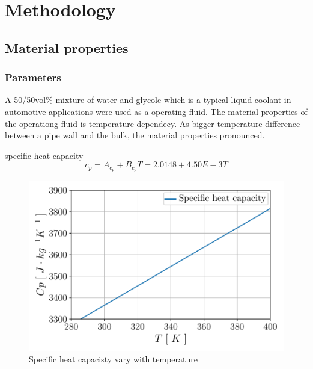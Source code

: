 \documentclass[12pt,oneside]{jbook}
\begin{document}
\chapter{Methodology}
\section{Material properties}

\subsection{Parameters}
A 50/50vol\% mixture of water and glycole which is a typical liquid coolant in automotive applications were used as a operating fluid.
The material properties of the operationg fluid is temperature dependecy.
As bigger temperature difference between a pipe wall and the bulk, the material properties pronounced.


specific heat capacity
\begin{equation}
	c_{p} = A_{c_{p}}+B_{c_{p}} T = 2.0148 + 4.50E-3T
	\label{Cp}
\end{equation}
\begin{figure}[ht]
	\vspace{0zh}
	\begin{center}
		\includegraphics[width=0.65\linewidth]{fig/mp_cp.pdf}
		\vspace{-1zh}
		\caption{Specific heat capacisty vary with temperature}
		\label{cp}
	\end{center}
	\vspace{0zh}
\end{figure}
\end{document}
